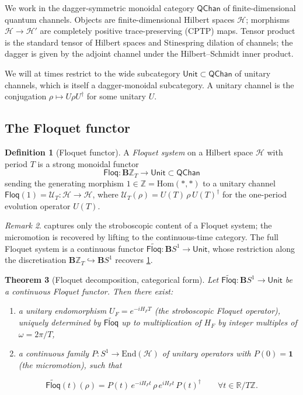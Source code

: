 \documentclass[12pt]{article}
\newtheorem{theorem}{Theorem}[section]
\theoremstyle{definition}
\newtheorem{definition}[theorem]{Definition}
\theoremstyle{remark}
\newtheorem{remark}[theorem]{Remark}
\newcommand{\Hcal}{\mathcal{H}}
\newcommand{\Z}{\mathbb{Z}}
\newcommand{\R}{\mathbb{R}}
\newcommand{\one}{\mathbf{1}}
\newcommand{\HF}{H_{F}}
\newcommand{\Floq}{\mathsf{Floq}}
\newcommand{\QChan}{\mathsf{QChan}}
\begin{document}
We work in the dagger-symmetric monoidal category $\QChan$ of finite-dimensional quantum channels. Objects are finite-dimensional Hilbert spaces $\Hcal$; morphisms $\Hcal\to\Hcal'$ are completely positive trace-preserving (CPTP) maps. Tensor product is the standard tensor of Hilbert spaces and Stinespring dilation of channels; the dagger is given by the adjoint channel under the Hilbert--Schmidt inner product.

We will at times restrict to the wide subcategory $\mathsf{Unit}\subset\QChan$ of unitary channels, which is itself a dagger-monoidal subcategory. A unitary channel is the conjugation $\rho\mapsto U\rho U^\dagger$ for some unitary $U$.

\subsection{The Floquet functor}

\begin{definition}[Floquet functor]
\label{def:floquet-functor}
A \emph{Floquet system} on a Hilbert space $\Hcal$ with period $T$ is a strong monoidal functor
\begin{equation}
\Floq\colon \mathbf{B}\Z_T \longrightarrow \mathsf{Unit}\subset\QChan
\end{equation}
sending the generating morphism $1\in\Z=\mathrm{Hom}(*,*)$ to a unitary channel $\Floq(1)=\mathcal{U}_T\colon\Hcal\to\Hcal$, where $\mathcal{U}_T(\rho)=U(T)\,\rho\,U(T)^\dagger$ for the one-period evolution operator $U(T)$.
\end{definition}

\begin{remark}
 captures only the stroboscopic content of a Floquet system; the micromotion is recovered by lifting to the continuous-time category. The full Floquet system is a continuous functor $\widetilde{\Floq}\colon\mathbf{B}S^1\to\mathsf{Unit}$, whose restriction along the discretisation $\mathbf{B}\Z_T\hookrightarrow\mathbf{B}S^1$ recovers \cref{def:floquet-functor}.
\end{remark}

\begin{theorem}[Floquet decomposition, categorical form]
\label{thm:floquet-decomp}
Let $\widetilde{\Floq}\colon\mathbf{B}S^1\to\mathsf{Unit}$ be a continuous Floquet functor. Then there exist:
\begin{enumerate}
\item a unitary endomorphism $U_F=e^{-i\HF T}$ (the stroboscopic Floquet operator), uniquely determined by $\widetilde{\Floq}$ up to multiplication of $\HF$ by integer multiples of $\omega = 2\pi/T$,
\item a continuous family $P\colon S^1\to\mathrm{End}(\Hcal)$ of unitary operators with $P(0)=\one$ (the micromotion), such that
\end{enumerate}
\begin{equation}
\widetilde{\Floq}(t)(\rho) = P(t)\,e^{-i\HF t}\,\rho\,e^{i\HF t}\,P(t)^\dagger \qquad \forall t\in\R/T\Z.
\end{equation}
\end{theorem}
\end{document}
